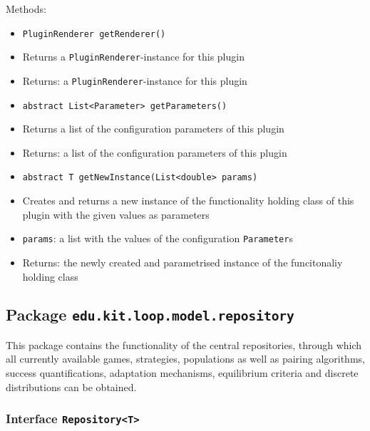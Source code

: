 \documentclass[parskip=full,11pt]{scrartcl}
\begin{document}
Methods:
\begin{itemize}\itemsep -10pt
	\item \texttt{PluginRenderer getRenderer()}
	\item[] Returns a \texttt{PluginRenderer}-instance for this plugin
	\item[] Returns: a \texttt{PluginRenderer}-instance for this plugin

	\item \texttt{abstract List<Parameter> getParameters()}
	\item[] Returns a list of the configuration parameters of this plugin
	\item[] Returns: a list of the configuration parameters of this plugin

	\item \texttt{abstract T getNewInstance(List<double> params)}
	\item[] Creates and returns a new instance of the functionality holding class of this plugin with the given values as parameters
	\item[] \texttt{params}: a list with the values of the configuration \texttt{Parameter}s
	\item[] Returns: the newly created and parametrised instance of the funcitonaliy holding class
\end{itemize}

\subsection{Package \texttt{edu.kit.loop.model.repository}}

This package contains the functionality of the central repositories, through which all currently available games, strategies, populations as well as pairing algorithms, success quantifications, adaptation mechanisms, equilibrium criteria and discrete distributions can be obtained.

\subsubsection{Interface \texttt{Repository<T>}}
\end{document}
